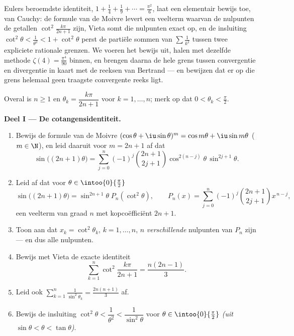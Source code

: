 Eulers beroemdste identiteit, $1 + \frac14 + \frac19 + \cdots =
\frac{\pi^2}6$, laat een  elementair bewijs toe, van
Cauchy: de formule van de Moivre levert een veelterm waarvan de
nulpunten de getallen $\cot^2\frac{k\pi}{2n+1}$ zijn, Vieta somt
die nulpunten exact op, en de insluiting $\cot^2\theta <
\frac{1}{\theta^2} < 1 + \cot^2\theta$ perst de partiële sommen van
$\sum\frac1{k^2}$ tussen twee expliciete rationale grenzen. We
voeren het bewijs  uit, halen met dezelfde methode $\zeta(4)
= \frac{\pi^4}{90}$ binnen, en brengen daarna de hele grens tussen
convergentie en divergentie in kaart met de reeksen van Bertrand
--- en bewijzen dat er op die grens helemaal geen traagste
convergente reeks ligt.

\begin{problem}[{Weekendopgave --- $\zeta(2) = \pi^2/6$ en het
panorama van Bertrand}]
\label{pb:b2:series:1}
Overal is $n \geq 1$ en $\theta_k = \dfrac{k\pi}{2n+1}$ voor $k =
1, \dots, n$; merk op dat $0 < \theta_k < \frac\pi2$.

\medskip
\noindent\textbf{Deel I --- De cotangensidentiteit.}
\begin{enumerate}
  \item Bewijs de formule van de Moivre $(\cos\theta +
        \iu\sin\theta)^m = \cos m\theta + \iu\sin m\theta$ ($m \in
        \N$), en leid daaruit voor $m = 2n + 1$ af dat
        \[
        \sin\bigl((2n{+}1)\theta\bigr) = \sum_{j=0}^{n}
        (-1)^j\binom{2n+1}{2j+1}\cos^{2(n-j)}\theta\,
        \sin^{2j+1}\theta .
        \]
  \item Leid af dat voor $\theta \in \intoo{0}{\frac\pi2}$
        \[
        \sin\bigl((2n{+}1)\theta\bigr) =
        \sin^{2n+1}\theta\; P_n(\cot^2\theta),
        \qquad
        P_n(x) = \sum_{j=0}^{n}
        (-1)^j\binom{2n+1}{2j+1}x^{\,n-j},
        \]
        een veelterm van graad $n$ met kopcoëfficiënt $2n + 1$.
  \item Toon aan dat $x_k = \cot^2\theta_k$, $k = 1, \dots, n$,
        $n$ \emph{verschillende} nulpunten van $P_n$ zijn --- en
        dus alle nulpunten.
  \item Bewijs met Vieta de exacte identiteit
        \[
        \sum_{k=1}^{n} \cot^2\frac{k\pi}{2n+1}
        = \frac{n(2n-1)}{3}.
        \]
  \item Leid ook $\displaystyle\sum_{k=1}^{n}
        \frac{1}{\sin^2\theta_k} = \frac{2n(n+1)}{3}$ af.
  \item Bewijs de insluiting $\cot^2\theta < \dfrac1{\theta^2} <
        \dfrac{1}{\sin^2\theta}$ voor $\theta \in
        \intoo{0}{\frac\pi2}$ \emph{(uit $\sin\theta < \theta <
        \tan\theta$)}.
\end{enumerate}


\end{problem}

